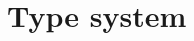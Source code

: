 \documentclass[preprint]{sigplanconf}
\makeatletter
\newcommand{\many}{\overline}
\newcommand\ba{\begin{array}}
\newcommand\ea{\end{array}}
\newcommand{\bstack}{\begin{array}[t]{@{}l@{}}}
\newcommand{\estack}{\end{array}}
\newenvironment{equations}{\[\ba{@{}r@{~}c@{~}l@{}}}{\ea\]}
\newcommand{\effbox}[1]{[#1]}
\newcommand{\var}{\mathit}
\newcommand{\thunk}[1]{\{{#1}\}}
\makeatother
\begin{document}









\section{Type system}
\label{sec:frank}
\end{document}
